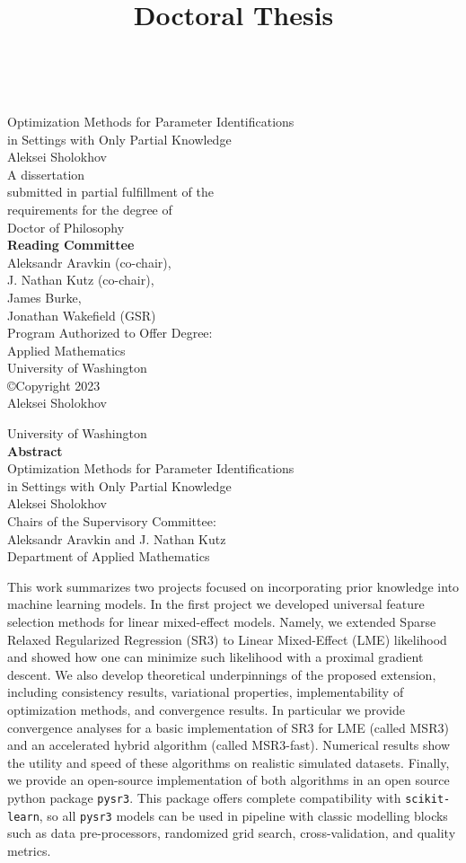 \documentclass[12pt,a4paper]{book}
\newcommand{\userName}{Aleksei Sholokhov}
\newcommand{\department}{Department of Applied Mathematics}
\newcommand{\institution}{University of Washington}
\newcommand{\doctitle}{Doctoral Thesis}
\newcommand{\projectNameLong}{Optimization Methods for Parameter Identifications \\ in Settings with Only Partial Knowledge}
\numberwithin{equation}{section} %
\numberwithin{figure}{section} %
\numberwithin{table}{section} %
\begin{document}
\title{\doctitle}
~\\
{\center
{\large 
{\large
\projectNameLong
}
\\[10mm]
\userName
\\[20mm]
{A dissertation \\
 submitted in partial fulfillment of the\\ requirements for the degree of}
\\[5mm]
{Doctor of Philosophy}
\\[20mm]
{\center
\textbf{Reading Committee}\\
Aleksandr Aravkin (co-chair),\\
J. Nathan Kutz (co-chair), \\
James Burke, \\
Jonathan Wakefield (GSR)
}
\\[20mm]
Program Authorized to Offer Degree:
\\[5mm]
Applied Mathematics
\\[5mm]
\institution
}
\\[10mm]
©Copyright 2023\\
\userName

}  

\newpage
{
\center 
\institution
\\[10mm]
\textbf{Abstract}
\\[10mm]
\projectNameLong
\\[10mm]
\userName
\\[10mm]
Chairs of the Supervisory Committee:\\
Aleksandr Aravkin and J. Nathan Kutz\\
\department
\\[10mm]
}

This work summarizes two projects focused on incorporating prior knowledge into machine learning models. In the first project we developed universal feature selection methods for linear mixed-effect models. Namely, we extended Sparse Relaxed Regularized Regression (SR3) to Linear Mixed-Effect (LME) likelihood and showed how one can minimize such likelihood with a proximal gradient descent. We also develop theoretical underpinnings of the proposed extension, including consistency results, variational properties, implementability of optimization methods, and convergence results. In particular we provide convergence analyses for a basic implementation of SR3 for LME (called MSR3) and an accelerated hybrid algorithm (called MSR3-fast). Numerical results show the utility and speed of these algorithms on realistic simulated datasets. Finally, we provide an open-source implementation of both algorithms in an open source python package \texttt{pysr3}. This package offers complete compatibility with \texttt{scikit-learn}, so all \texttt{pysr3} models can be used in pipeline with classic modelling blocks such as data pre-processors, randomized grid search, cross-validation, and quality metrics.
\end{document}
